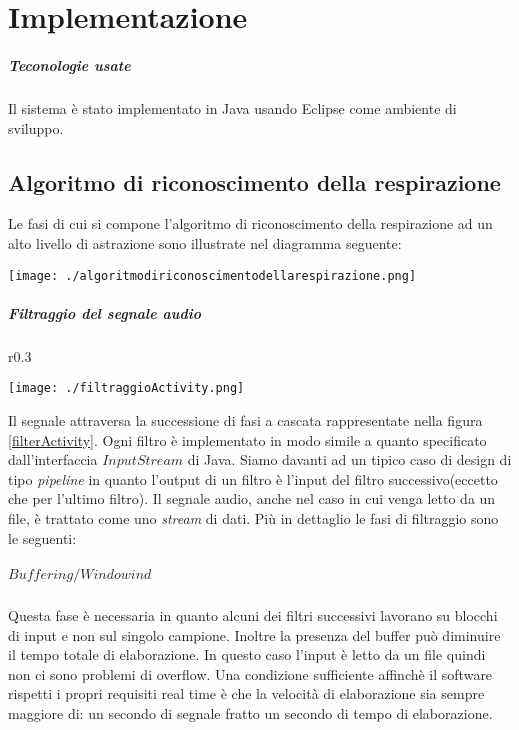 \chapter{Implementazione}

\paragraph{Teconologie usate}
    Il sistema \`e stato implementato in Java usando Eclipse come ambiente di sviluppo.
  
  \section{Algoritmo di riconoscimento della respirazione}
    Le fasi di cui si compone l'algoritmo di riconoscimento della respirazione ad un alto livello di astrazione sono illustrate nel diagramma seguente:
    \begin{center}
      \texttt{[image: ./algoritmodiriconoscimentodellarespirazione.png]}
    \end{center}

      \paragraph{Filtraggio del segnale audio}
	\begin{wrapfigure}{r}{0.3\textwidth}
	  \begin{center}
	    \texttt{[image: ./filtraggioActivity.png]}
	  \end{center}
	  \caption{Diagramma di attivit\`a della fase di filtraggio}
	  \label{filterActivity}
	\end{wrapfigure}
	Il segnale attraversa la successione di fasi a cascata rappresentate nella figura \ref{filterActivity}. 
	Ogni filtro \`e implementato in modo simile a quanto specificato dall'interfaccia $InputStream$ di Java. 
	Siamo davanti ad un tipico caso di design di tipo \emph{pipeline} in quanto l'output di un filtro \`e l'input del filtro successivo(eccetto che per l'ultimo filtro). 
	Il segnale audio, anche nel caso in cui venga letto da un file, \`e trattato come uno \emph{stream} di dati. 
	Pi\`u in dettaglio le fasi di filtraggio sono le seguenti:
      \paragraph{$Buffering/Windowind$}
	Questa fase \`e necessaria in quanto alcuni dei filtri successivi lavorano su blocchi di input e non sul singolo campione. 
	Inoltre la presenza del buffer pu\`o diminuire il tempo totale di elaborazione.
	In questo caso l'input \`e letto da un file quindi non ci sono problemi di overflow.
	Una condizione sufficiente affinch\`e il software rispetti i propri requisiti real time \`e che la velocit\`a di elaborazione sia sempre maggiore di: un secondo di segnale fratto un secondo di tempo di elaborazione. 
